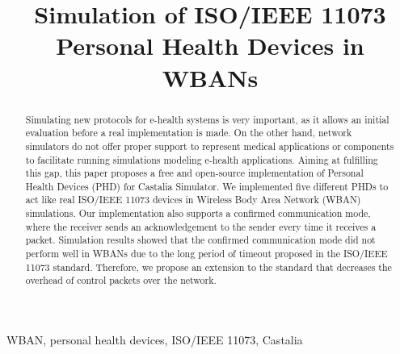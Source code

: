 \documentclass[conference]{IEEEtran}
\begin{document}
\title{Simulation of ISO/IEEE 11073 Personal Health Devices in WBANs\\
}

\author{
}

\maketitle

\begin{abstract}
Simulating new protocols for e-health systems is very important, as it allows an initial evaluation before a real implementation is made. On the other hand, network simulators do not offer proper support to represent medical applications or components to facilitate running simulations modeling e-health applications. Aiming at fulfilling this gap, this paper proposes a free and open-source implementation of Personal Health Devices (PHD) for Castalia Simulator. We implemented five different PHDs to act like real ISO/IEEE 11073 devices in Wireless Body Area Network (WBAN) simulations. Our implementation also supports a confirmed communication mode, where the receiver sends an  acknowledgement to the sender every time it receives a packet. Simulation results showed that the confirmed communication mode did not perform well in WBANs due to the long period of timeout proposed in the ISO/IEEE 11073 standard. Therefore, we propose an extension to the standard that decreases the overhead of control packets over the network.
\end{abstract}

\begin{IEEEkeywords}
WBAN, personal health devices, ISO/IEEE 11073, Castalia
\end{IEEEkeywords}
\end{document}
